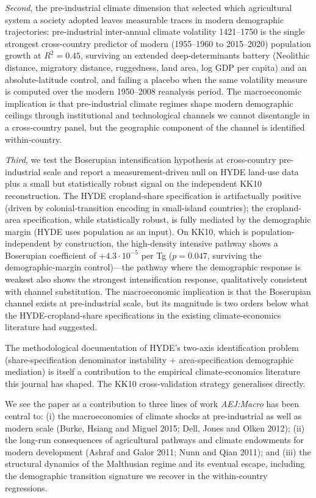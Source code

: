 \documentclass[11pt,letterpaper]{article}
\begin{document}
\emph{Second}, the pre-industrial climate dimension that selected which agricultural system a society adopted leaves measurable traces in modern demographic trajectories: pre-industrial inter-annual climate volatility 1421--1750 is the single strongest cross-country predictor of modern (1955--1960 to 2015--2020) population growth at $R^2 = 0.45$, surviving an extended deep-determinants battery (Neolithic distance, migratory distance, ruggedness, land area, log GDP per capita) and an absolute-latitude control, and failing a placebo when the same volatility measure is computed over the modern 1950--2008 reanalysis period. The macroeconomic implication is that pre-industrial climate regimes shape modern demographic ceilings through institutional and technological channels we cannot disentangle in a cross-country panel, but the geographic component of the channel is identified within-country.

\emph{Third}, we test the Boserupian intensification hypothesis at cross-country pre-industrial scale and report a measurement-driven null on HYDE land-use data plus a small but statistically robust signal on the independent KK10 reconstruction. The HYDE cropland-share specification is artifactually positive (driven by colonial-transition encoding in small-island countries); the cropland-area specification, while statistically robust, is fully mediated by the demographic margin (HYDE uses population as an input). On KK10, which is population-independent by construction, the high-density intensive pathway shows a Boserupian coefficient of $+4.3\!\cdot\!10^{-5}$ per Tg ($p=0.047$, surviving the demographic-margin control)---the pathway where the demographic response is weakest also shows the strongest intensification response, qualitatively consistent with channel substitution. The macroeconomic implication is that the Boserupian channel exists at pre-industrial scale, but its magnitude is two orders below what the HYDE-cropland-share specifications in the existing climate-economics literature had suggested.

The methodological documentation of HYDE's two-axis identification problem (share-specification denominator instability + area-specification demographic mediation) is itself a contribution to the empirical climate-economics literature this journal has shaped. The KK10 cross-validation strategy generalises directly.

We see the paper as a contribution to three lines of work \emph{AEJ:Macro} has been central to: (i) the macroeconomics of climate shocks at pre-industrial as well as modern scale (Burke, Hsiang and Miguel 2015; Dell, Jones and Olken 2012); (ii) the long-run consequences of agricultural pathways and climate endowments for modern development (Ashraf and Galor 2011; Nunn and Qian 2011); and (iii) the structural dynamics of the Malthusian regime and its eventual escape, including the demographic transition signature we recover in the within-country regressions.
\end{document}
